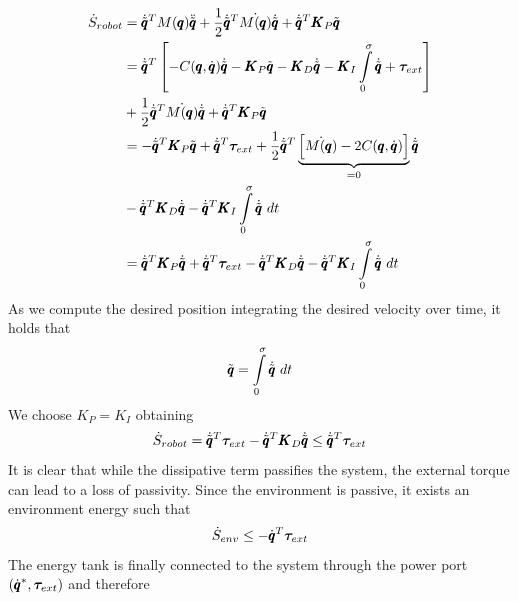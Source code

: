 \begin{equation}
\begin{aligned}
    \dot{S}_{robot} &= \dot{\tilde{\pmb{q}}}^T M(\pmb{q}) \ddot{\tilde{\pmb{q}}} + \frac{1}{2} \dot{\tilde{\pmb{q}}}^T \dot{M(\pmb{q})} \dot{\tilde{\pmb{q}}} + \dot{\tilde{\pmb{q}}}^T \pmb{K}_P \tilde{\pmb{q}} \\
    &= \dot{\tilde{\pmb{q}}}^T \left[ -C(\pmb{q}, \dot{\pmb{q}}) \dot{\tilde{\pmb{q}}} - \pmb{K}_P \tilde{\pmb{q}} - \pmb{K}_D \dot{\tilde{\pmb{q}}} - \pmb{K}_I \int\limits_{0}^{\sigma} \dot{\tilde{\pmb{q}}} + \boldsymbol{\tau}_{ext} \right] \\
    &+ \frac{1}{2} \dot{\tilde{\pmb{q}}}^T \dot{M(\pmb{q})} \dot{\tilde{\pmb{q}}} + \dot{\tilde{\pmb{q}}}^T \pmb{K}_P \tilde{\pmb{q}} \\
    &= -\dot{\tilde{\pmb{q}}}^T \pmb{K}_P \tilde{\pmb{q}} + \dot{\tilde{\pmb{q}}}^T \boldsymbol{\tau}_{ext} + \frac{1}{2} \dot{\tilde{\pmb{q}}}^T \underbrace{\left[ \dot{M(\pmb{q})} - 2C(\pmb{q}, \dot{\pmb{q}}) \right]}_{=0} \dot{\tilde{\pmb{q}}} \\
    &- \dot{\tilde{\pmb{q}}}^T \pmb{K}_D \dot{\tilde{\pmb{q}}}  - \dot{\tilde{\pmb{q}}}^T \pmb{K}_I \int\limits^{\sigma}_{0} \dot{\tilde{\pmb{q}}}\ dt\\
    &= \dot{\tilde{\pmb{q}}}^T \pmb{K}_P \dot{\tilde{\pmb{q}}} + \dot{\tilde{\pmb{q}}}^T \boldsymbol{\tau}_{ext} - \dot{\tilde{\pmb{q}}}^T \pmb{K}_D \dot{\tilde{\pmb{q}}} -  \dot{\tilde{\pmb{q}}}^T \pmb{K}_I \int\limits^{\sigma}_{0} \dot{\tilde{\pmb{q}}}\ dt  
\end{aligned}
\end{equation}
As we compute the desired position integrating the desired velocity over time, it holds that 
\begin{equation}
    \tilde{\pmb{q}} = \int\limits^{\sigma}_{0}
    \dot{\tilde{\pmb{q}}}\ dt
\end{equation}
We choose $K_P = K_I$ obtaining
\begin{equation}
    \dot{S}_{robot} = \dot{\tilde{\pmb{q}}}^T \boldsymbol{\tau}_{ext} - \dot{\tilde{\pmb{q}}}^T \pmb{K}_D \dot{\tilde{\pmb{q}}} \leq \dot{\tilde{\pmb{q}}}^T \boldsymbol{\tau}_{ext} 
\end{equation}
It is clear that while the dissipative term passifies the system, the external torque can lead to a loss of passivity. Since the environment is passive, it exists an environment energy such that ~\cite{shahriari2018valve}
\begin{equation}
    \dot{S}_{env} \leq -\dot{\pmb{q}}^T \boldsymbol{\tau}_{ext}
\end{equation}
The energy tank is finally connected to the system through the power port $(\dot{\pmb{q}}^*, \boldsymbol{\tau}_{ext})$ and therefore
